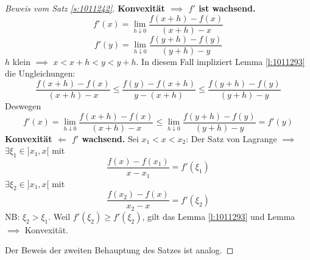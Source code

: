 \begin{proof}[Beweis vom Satz \ref{s:1011242}]
  {\bf Konvexität $\implies$ $f'$ ist wachsend.}
  \[f'(x)=\lim_{h\downarrow 0}\frac{f(x+h)-f(x)}{(x+h)-x}\]
  \[f'(y)=\lim_{h\downarrow 0}\frac{f(y+h)-f(y)}{(y+h)-y}\]
  $h$ klein $\implies$ $x<x+h<y<y+h$.
In diesem Fall impliziert Lemma \ref{l:1011293} die Ungleichungen:
\[ 
 \frac{f(x+h)-f(x)}{(x+h)-x}\leq \frac{f(y)-f(x+h)}{y-(x+h)}
\leq \frac{f(y+h)-f(y)}{(y+h)-y}
\]
Deswegen
\[
f' (x) = \lim_{h\downarrow 0}\frac{f(x+h)-f(x)}{(x+h)-x}\leq
\lim_{h\downarrow 0}\frac{f(y+h)-f(y)}{(y+h)-y} = f'(y)
\]
{\bf Konvexität $\Leftarrow$ $f'$ wachsend.} 
Sei $x_1<x<x_2$: Der Satz von Lagrange $\implies$ $\exists \xi_1\in]x_1,x[$ mit
  \[\frac{f(x)-f(x_1)}{x-x_1}=f'(\xi_1)\]
  $\exists \xi_2\in]x_1,x[$ mit
  \[\frac{f(x_2)-f(x)}{x_2-x}=f'(\xi_2)\]
  NB: $\xi_2>\xi_1$. Weil $f'(\xi_2)\geq f'(\xi_2)$, gilt das Lemma 
\ref{l:1011293} und Lemma $\implies$ Konvexität.

Der Beweis der zweiten Behauptung des Satzes ist analog.
\end{proof}
